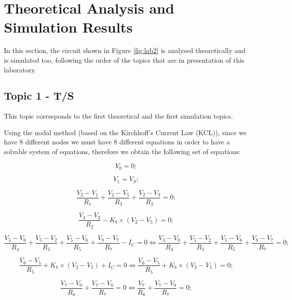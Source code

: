 \section{Theoretical Analysis and Simulation Results}
\label{sec:analysis}

In this section, the circuit shown in Figure \ref{fig:lab2} is analysed
theoretically and is simulated too, following the order of the topics that are in presentation of this laboratory. %
\subsection{Topic 1 - T/S}
This topic corresponds to the first theoretical and the first simulation topics.
\par
Using the nodal method (based on the Kirchhoff's Current Law (KCL)), since we have 8 different nodes we must have 8 different 
equations in order to have a solvable system of equations, therefore we obtain the following set of equations:

\begin{equation} 	%
  V_0=0          ;
  \label{eq:1}
\end{equation}

\begin{equation} 	%
  V_1=V_S           ;
  \label{eq:2}
\end{equation}

\begin{equation} 	%
  \frac{V_2-V_1}{R_1}+\frac{V_2-V_5}{R_3}+\frac{V_2-V_3}{R_2}=0    ;
  \label{eq:3}
\end{equation}

\begin{equation} 	%
  \frac{V_3-V_2}{R_2}-K_b\times(V_2-V_5)=0    ;
  \label{eq:4}
\end{equation}

\begin{equation} 	%
  \frac{V_5-V_0}{R_4}+\frac{V_5-V_2}{R_3}+\frac{V_5-V_6}{R_5}+\frac{V_8-V_7}{R_7}-I_C=0 \iff \frac{V_3-V_0}{R_4}+\frac{V_5-V_2}{R_3}+\frac{V_5-V_6}{R_5}+\frac{V_8-V_7}{R_7}=0    ;
  \label{eq:5}
\end{equation}

\begin{equation} 	%
  \frac{V_6-V_5}{R_5}+K_b\times(V_2-V_5)+I_C=0 \iff \frac{V_6-V_5}{R_5}+K_b\times(V_2-V_5)=0   ;
  \label{eq:6}
\end{equation}

\begin{equation} 	%
  \frac{V_7-V_0}{R_6}+\frac{V_7-V_8}{R_7}=0 \iff \frac{V_7}{R_6}+\frac{V_7-V_8}{R_7}=0   ;
  \label{eq:7}
\end{equation}

